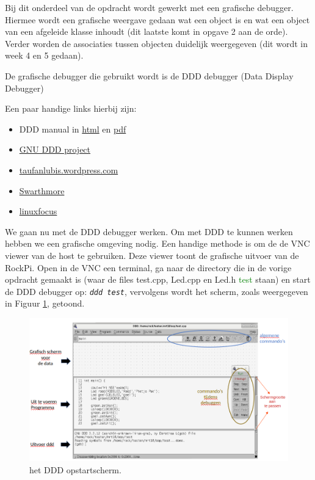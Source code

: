 Bij dit onderdeel van de opdracht wordt gewerkt met een grafische debugger. Hiermee wordt een grafische weergave gedaan wat een object is en wat een object van een afgeleide klasse inhoudt (dit laatste komt in opgave 2 aan de orde). Verder worden de associaties tussen objecten duidelijk weergegeven (dit wordt in week 4 en 5 gedaan).

De grafische debugger die gebruikt wordt is de DDD debugger (Data Display Debugger) 


Een paar handige links hierbij zijn:

\begin{itemize}
	\item DDD manual in \href{https://www.gnu.org/software/ddd/manual/html_mono/ddd.html}{html} en \href{https://www.gnu.org/software/ddd/manual/pdf/ddd.pdf}{pdf}
	\item \href{https://www.gnu.org/software/ddd/}{GNU DDD project}
	\item \href{href="https://taufanlubis.wordpress.com/2019/02/19/gnu-debugger-front-end-graphical-user-interface-with-ddd}{taufanlubis.wordpress.com}
	\item  \href{https://www.cs.swarthmore.edu/~newhall/unixhelp/howto_gdb.php}{Swarthmore}
	\item  \href{http://www.linuxfocus.org/English/January1998/article20.html}{linuxfocus}
\end{itemize}

We gaan nu met de DDD debugger werken.
Om met DDD te kunnen werken hebben we een grafische omgeving nodig. Een handige methode is om de de VNC viewer van de host te gebruiken. Deze viewer toont de grafische uitvoer van de RockPi. Open in de VNC een terminal, ga naar de directory die in de vorige opdracht gemaakt is (waar de files test.cpp, Led.cpp en Led.h \textcolor{green}{test} staan) en start de DDD debugger op:
\texttt{\textit{ddd test}}, vervolgens wordt het scherm, zoals weergegeven in Figuur \ref{fig:dddscherm1}, getoond.
\begin{figure}[h!]
	\captionsetup{justification=centering}
	\includegraphics[width=0.8 \linewidth]{figuren/ddd_startup_screen}
	\centering
	\caption{het DDD opstartscherm.}
	\label{fig:dddscherm1}
\end{figure}

